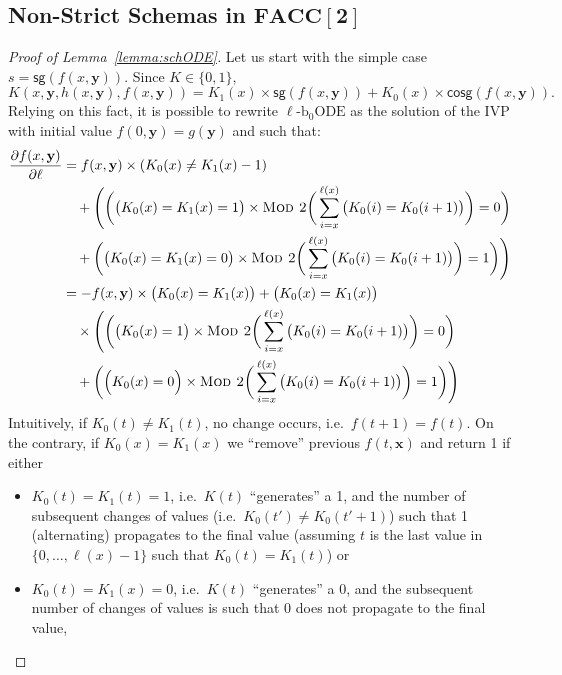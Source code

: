 \documentclass[11pt, oneside]{article}
\newenvironment{toappendix}{}{}
\newcommand{\fun}[1]{\mathsf{#1}}
\newcommand{\FACC}{\mathbf{FACC[2]}}
\newcommand{\tu}[1]{\mathbf{#1}}
\theoremstyle{definition}
\newcommand{\schODE}{\ell\text{-b}_0\text{ODE}}
\begin{document}
\begin{toappendix}
\subsection{Non-Strict Schemas in $\FACC$}\label{appendix:FACC}

\begin{proof}[Proof of Lemma~\ref{lemma:schODE}]
    Let us start with the simple case $s=\fun{sg}(f(x, \tu y))$.
    Since $K\in \{0,1\}$,
    $$
    K(x, \tu y, h(x, \tu y), f(x, \tu y)) = K_1(x) \times \fun{sg}(f(x,\tu y)) + K_0(x) \times \fun{cosg}(f(x, \tu y)).
    $$
    Relying on this fact, it is possible to rewrite $\schODE$ as the solution of the IVP with initial value $f(0, \tu y)=g(\tu y)$ and such that:
    \small
    \begin{align*}
        \frac{\partial f(x, \tu y)}{\partial \ell} &= f(x, \tu y) \times (K_0(x) \neq K_1(x) -1) \\
        &\quad + \Bigg(\bigg(\big(K_0(x) = K_1(x) = 1\big) \times \textsc{Mod 2}\bigg(\sum^{\ell(x)}_{i=x}\big(K_0(i) = K_0(i+1)\big)\bigg) = 0\bigg) \\
        &\quad + \bigg(\big(K_0(x) = K_1(x) = 0 \big) \times \textsc{Mod 2} \bigg(\sum^{\ell(x)}_{i=x}\big(K_0(i) = K_0(i+1)\big)\bigg)=1\bigg)\Bigg) \\
        &= -f(x, \tu y) \times \big(K_0(x) = K_1(x)\big) + \big(K_0(x) = K_1(x)\big) \\
        &\quad \times \Bigg(\bigg(\big(K_0(x) = 1 \big) \times \textsc{Mod 2}\bigg(\sum^{\ell(x)}_{i=x} \big(K_0(i) = K_0(i+1)\big)\bigg) = 0\bigg) \\
        & \quad + \bigg(\Big(K_0(x) = 0\Big) \times \textsc{Mod 2}\bigg(\sum^{\ell(x)}_{i=x}\big(K_0(i) = K_0(i+1)\big)\bigg) =1 \bigg)\Bigg)
    \end{align*}
    \normalsize
    Intuitively, if $K_0(t) \neq K_1(t)$, no change occurs, i.e.~$f(t+1)=f(t)$.
    On the contrary, if $K_0(x)=K_1(x)$ we ``remove'' previous $f(t,\tu x)$ and return 1 if either
    \begin{itemize}
        \itemsep0em
        \item $K_0(t)=K_1(t)=1$, i.e.~$K(t)$ ``generates'' a 1, and the number of subsequent changes of values (i.e.~$K_0(t') \neq K_0(t'+1)$) such that 1 (alternating) propagates to the final value (assuming $t$ is the last value in $\{0,\dots, \ell(x)-1\}$ such that $K_0(t)=K_1(t)$) or
        \item $K_0(t)=K_1(x)=0$, i.e.~$K(t)$ ``generates'' a 0, and the subsequent number of changes of values is such that 0 does not propagate to the final value,

\end{itemize}
\end{proof}
\end{toappendix}
\end{document}
